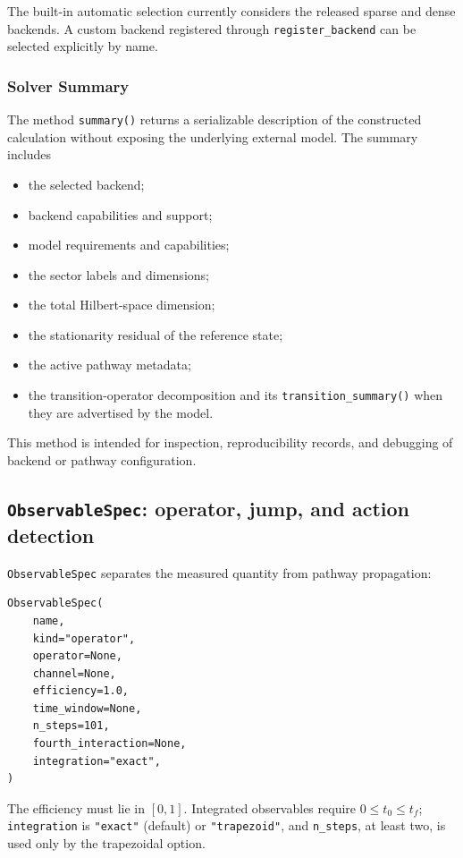 \documentclass[11pt]{article}
\begin{document}
The built-in automatic selection currently considers the released sparse and
dense backends. A custom backend registered through \texttt{register\_backend}
can be selected explicitly by name.





\subsubsection{Solver Summary}

The method \texttt{summary()} returns a serializable description of the constructed calculation without exposing the underlying external model. The summary includes
\begin{itemize} 
    \item the selected backend;
    \item backend capabilities and support;
    \item model requirements and capabilities;
    \item the sector labels and dimensions;
    \item the total Hilbert-space dimension;
    \item the stationarity residual of the reference state;
    \item the active pathway metadata;
    \item the transition-operator decomposition and its \texttt{transition\_summary()} when they are advertised by the
    model.
\end{itemize}
This method is intended for inspection, reproducibility records, and debugging of backend or pathway configuration. 

\subsection{\texttt{ObservableSpec}: operator, jump, and action detection}
\label{sec:observables}

\texttt{ObservableSpec} separates the measured quantity from pathway propagation:
\begin{verbatim}
ObservableSpec(
    name,
    kind="operator",
    operator=None,
    channel=None,
    efficiency=1.0,
    time_window=None,
    n_steps=101,
    fourth_interaction=None,
    integration="exact",
)
\end{verbatim}
The efficiency must lie in $[0,1]$. Integrated observables require $0\leq t_0\leq t_f$; \texttt{integration} is \texttt{"exact"} (default) or \texttt{"trapezoid"}, and \texttt{n\_steps}, at least two, is used only by the trapezoidal option.
\end{document}

